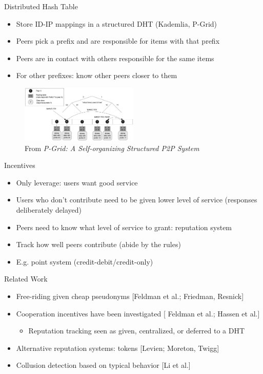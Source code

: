 \documentclass[presentation,english,usenames,dvipsnames]{beamer}
\begin{document}
\begin{frame}{Distributed Hash Table}
  \begin{itemize}
    \item Store ID-IP mappings in a structured DHT (Kademlia, P-Grid)
    \item Peers pick a prefix and are responsible for items with that prefix
    \item Peers are in contact with others responsible for the same items
    \item For other prefixes: know other peers closer to them
  \end{itemize}
  \begin{figure}
    \centering
    \includegraphics[width=0.5\textwidth]{p-grid}
    \caption*{\tiny From \emph{P-Grid: A Self-organizing Structured P2P System}}
  \end{figure}
\end{frame}

\begin{frame}{Incentives}
  \begin{itemize}
    \item Only leverage: users want good service
    \item Users who don't contribute need to be given lower level of service
          (responses deliberately delayed)
    \item Peers need to know what level of service to grant: reputation system
    \item Track how well peers contribute (abide by the rules)
    \item E.g. point system (credit-debit/credit-only)
  \end{itemize}
\end{frame}

\begin{frame}{Related Work}
  \begin{itemize}
    \item Free-riding given cheap pseudonyms {\color{gray}\tiny[Feldman et al.;
          Friedman, Resnick]}
    \item Cooperation incentives have been investigated {\color{gray}\tiny[
          Feldman et al.; Hassen et al.]}
    \begin{itemize}
      \item Reputation tracking seen as given, centralized, or deferred to a DHT
    \end{itemize}
    \item Alternative reputation systems: tokens {\color{gray}\tiny[Levien;
          Moreton, Twigg]}
    \item Collusion detection based on typical behavior {\color{gray}\tiny[Li
          et al.]}
  \end{itemize}
\end{frame}
\end{document}
